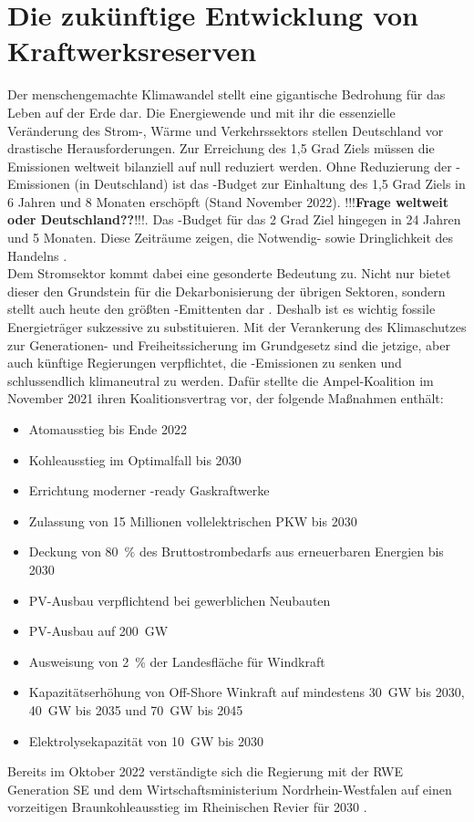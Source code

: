 		
\section{Die zukünftige Entwicklung von Kraftwerksreserven}
		
	Der menschengemachte Klimawandel stellt eine gigantische Bedrohung für das Leben auf der Erde dar. 
	Die Energiewende und mit ihr die essenzielle Veränderung des Strom-, Wärme und Verkehrssektors stellen Deutschland vor drastische Herausforderungen. 
	Zur Erreichung des 1,5 Grad Ziels müssen die Emissionen weltweit bilanziell auf null reduziert werden.
	Ohne Reduzierung der \COO-Emissionen (in Deutschland) ist das \COO-Budget zur Einhaltung des 1,5 Grad Ziels in 6 Jahren und 8 Monaten erschöpft (Stand November 2022). !!!\textbf{Frage weltweit oder Deutschland??}!!!.
	Das \COO-Budget für das 2 Grad Ziel hingegen in 24 Jahren und 5 Monaten. 
	Diese Zeiträume zeigen, die Notwendig- sowie Dringlichkeit des Handelns \cite{CO2_Uhr}. \\ 
	
	Dem Stromsektor kommt dabei eine gesonderte Bedeutung zu. 
	Nicht nur bietet dieser den Grundstein für die Dekarbonisierung der übrigen Sektoren, sondern stellt auch heute den größten \COO-Emittenten dar \cite{Umweltbundesamt_Emissionen}. 
	Deshalb ist es wichtig fossile Energieträger sukzessive zu substituieren. 
	Mit der Verankerung des Klimaschutzes zur Generationen- und Freiheitssicherung im Grundgesetz sind die jetzige, aber auch künftige Regierungen verpflichtet, die \COO-Emissionen zu senken und schlussendlich klimaneutral zu werden. 
	Dafür stellte die Ampel-Koalition im November 2021 ihren Koalitionsvertrag vor, der folgende Maßnahmen enthält\cite{Koalitionsvertrag}:
	\begin{itemize}
		\item Atomausstieg bis Ende 2022
		\item Kohleausstieg im Optimalfall bis 2030
		\item Errichtung moderner \Htwo-ready Gaskraftwerke
		\item Zulassung von 15 Millionen vollelektrischen PKW bis 2030
		\item Deckung von \SI{80}{\percent} des Bruttostrombedarfs aus erneuerbaren Energien bis 2030
		\item PV-Ausbau verpflichtend bei gewerblichen Neubauten
		\item PV-Ausbau auf \SI{200}{\giga\watt}
		\item Ausweisung von \SI{2}{\percent} der Landesfläche für Windkraft
		\item Kapazitätserhöhung von Off-Shore Winkraft auf mindestens \SI{30}{\giga\watt} bis 2030, \SI{40}{\giga\watt} bis 2035 und \SI{70}{\giga\watt} bis 2045
		\item Elektrolysekapazität von \SI{10}{\giga\watt} bis 2030
	\end{itemize}
	Bereits im Oktober 2022 verständigte sich die Regierung mit der RWE Generation SE und dem Wirtschaftsministerium Nordrhein-Westfalen auf einen vorzeitigen Braunkohleausstieg im Rheinischen Revier für 2030 \cite{Kohleausstieg_RWE}. \\
	

